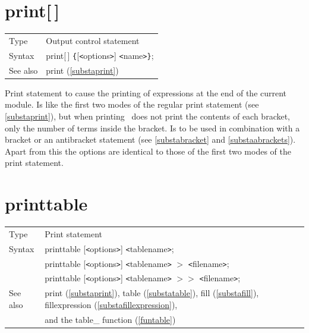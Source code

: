 \section{\texorpdfstring{print[\,]}{print[ ]}}
\label{substaprintc}

\noindent \begin{tabular}{ll}
Type & Output control statement\\
Syntax & print[\,] \verb:{:[{\tt<}options{\tt>}] {\tt<}name{\tt>}\verb:}:;
\\ See also & print (\ref{substaprint})
\end{tabular}\vspace{4mm}

\noindent Print statement to cause the printing 
of expressions at the end of the current module. Is like the first two 
modes of the regular print statement (see \ref{substaprint}), but when 
printing \FORM\ does not print the contents of each bracket, 
only the number of terms inside the bracket. Is to be used in combination 
with a bracket or an antibracket statement (see 
\ref{substabracket} and \ref{substaabrackets}). Apart from this the options 
are identical to those of the first two modes of the print statement. 
\vspace{10mm}


\section{printtable}
\label{substaprinttable}

\noindent \begin{tabular}{ll}
Type & Print statement\\
Syntax & printtable [{\tt<}options{\tt>}] {\tt<}tablename{\tt>};  \\
       & printtable [{\tt<}options{\tt>}] {\tt<}tablename{\tt>} $>$ {\tt<}filename{\tt>}; \\
       & printtable [{\tt<}options{\tt>}] {\tt<}tablename{\tt>} $>\!\!>$ {\tt<}filename{\tt>};
\\ See also & print (\ref{substaprint}),
            table (\ref{substatable}),
            fill (\ref{substafill}),
            fillexpression (\ref{substafillexpression}), \\ &
            and the table\_ function (\ref{funtable})
\end{tabular}\vspace{4mm}

